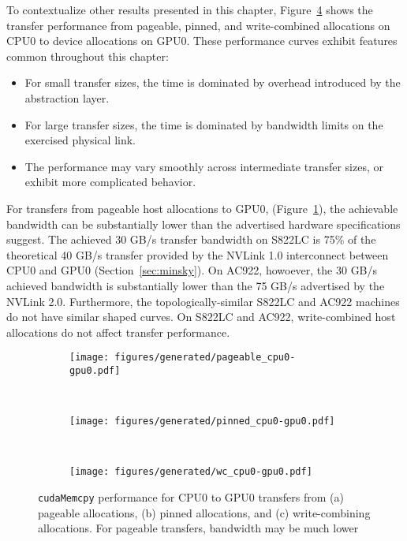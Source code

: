 To contextualize other results presented in this chapter, Figure~\ref{fig:pageable-pinned-wc} shows the transfer performance from pageable, pinned, and write-combined allocations on CPU0 to device allocations on GPU0.
These performance curves exhibit features common throughout this chapter:
\begin{itemize}
\item For small transfer sizes, the time is dominated by overhead introduced by the abstraction layer.
\item For large transfer sizes, the time is dominated by bandwidth limits on the exercised physical link.
\item The performance may vary smoothly across intermediate transfer sizes, or exhibit more complicated behavior.
\end{itemize}

For transfers from pageable host allocations to GPU0, (Figure~\ref{fig:pageable-cpu0-gpu0}), the achievable bandwidth can be substantially lower than the advertised hardware specifications suggest.
The achieved 30 GB/s transfer bandwidth on S822LC is 75\% of the theoretical 40 GB/s transfer provided by the NVLink 1.0 interconnect between CPU0 and GPU0 (Section~\ref{sec:minsky}).
On AC922, howoever, the 30 GB/s achieved bandwidth is substantially lower than the 75 GB/s advertised by the NVLink 2.0.
Furthermore, the topologically-similar S822LC and AC922 machines do not have similar shaped curves.
On S822LC and AC922, write-combined host allocations do not affect transfer performance.

\begin{figure}[ht]
    \centering
    \begin{subfigure}[b]{0.3\textwidth}
        \texttt{[image: figures/generated/pageable\_cpu0-gpu0.pdf]}
        \caption{}
        \label{fig:pageable-cpu0-gpu0}
    \end{subfigure}
    ~
    \begin{subfigure}[b]{0.3\textwidth}
        \texttt{[image: figures/generated/pinned\_cpu0-gpu0.pdf]}
        \caption{}
        \label{fig:}
    \end{subfigure}
    ~
    \begin{subfigure}[b]{0.3\textwidth}
        \texttt{[image: figures/generated/wc\_cpu0-gpu0.pdf]}
        \caption{}
        \label{fig:}
    \end{subfigure}
    \caption[]{
        \texttt{cudaMemcpy} performance for CPU0 to GPU0 transfers from 
        (a) pageable allocations,
        (b) pinned allocations, and
        (c) write-combining allocations.
        For pageable transfers, bandwidth may be much lower 
    }
    \label{fig:pageable-pinned-wc}
\end{figure}

